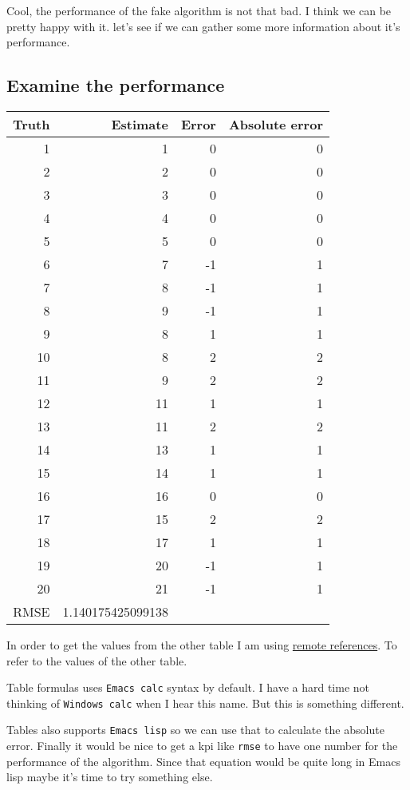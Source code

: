 \documentclass[11pt]{article}
\begin{document}
Cool, the performance of the fake algorithm is not that bad. I think we can be
pretty happy with it. let's see if we can gather some more information about
it's performance.

\subsection*{Examine the performance}
\label{sec:orgddd036f}

\begin{center}
\begin{tabular}{rrrr}
\hline
Truth & Estimate & Error & Absolute error\\
\hline
1 & 1 & 0 & 0\\
2 & 2 & 0 & 0\\
3 & 3 & 0 & 0\\
4 & 4 & 0 & 0\\
5 & 5 & 0 & 0\\
6 & 7 & -1 & 1\\
7 & 8 & -1 & 1\\
8 & 9 & -1 & 1\\
9 & 8 & 1 & 1\\
10 & 8 & 2 & 2\\
11 & 9 & 2 & 2\\
12 & 11 & 1 & 1\\
13 & 11 & 2 & 2\\
14 & 13 & 1 & 1\\
15 & 14 & 1 & 1\\
16 & 16 & 0 & 0\\
17 & 15 & 2 & 2\\
18 & 17 & 1 & 1\\
19 & 20 & -1 & 1\\
20 & 21 & -1 & 1\\
\hline
RMSE & 1.140175425099138 &  & \\
\hline
\end{tabular}

\end{center}

In order to get the values from the other table I am using \href{https://orgmode.org/manual/References.html\#index-remote-references-352}{remote references}. To
refer to the values of the other table.

Table formulas uses \texttt{Emacs calc} syntax by default. I have a hard time not
thinking of \texttt{Windows calc} when I hear this name. But this is something
different.

Tables also supports \texttt{Emacs lisp} so we can use that to calculate the absolute
error. Finally it would be nice to get a kpi like \texttt{rmse} to have one number for
the performance of the algorithm. Since that equation would be quite long in
Emacs lisp maybe it's time to try something else.
\end{document}

